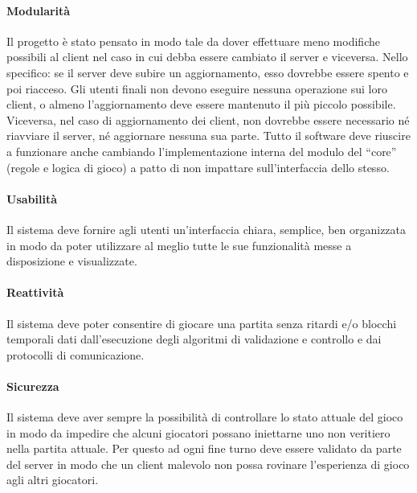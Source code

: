 \paragraph{Modularità}
Il progetto è stato pensato in modo tale da dover effettuare meno modifiche possibili al client nel caso in cui debba essere cambiato il server e viceversa.
Nello specifico: se il server deve subire un aggiornamento, esso dovrebbe essere spento e poi riacceso.
Gli utenti finali non devono eseguire nessuna operazione sui loro client, o almeno l’aggiornamento deve essere mantenuto il più piccolo possibile.
Viceversa, nel caso di aggiornamento dei client, non dovrebbe essere necessario né riavviare il server, né aggiornare nessuna sua parte.
Tutto il software deve riuscire a funzionare anche cambiando l’implementazione interna del modulo del “core” (regole e logica di gioco) a patto di non impattare sull’interfaccia dello stesso.

\paragraph{Usabilità}
Il sistema deve fornire agli utenti un'interfaccia chiara, semplice, ben organizzata in modo da poter utilizzare al meglio tutte le sue funzionalità messe a disposizione e visualizzate.

\paragraph{Reattività}
Il sistema deve poter consentire di giocare una partita senza ritardi e/o blocchi temporali dati dall’esecuzione degli algoritmi di validazione e controllo e dai protocolli di comunicazione.

\paragraph{Sicurezza}
Il sistema deve aver sempre la possibilità di controllare lo stato attuale del gioco in modo da impedire che alcuni giocatori possano iniettarne uno non veritiero nella partita attuale.
Per questo ad ogni fine turno deve essere validato da parte del server in modo che un client malevolo non possa rovinare l’esperienza di gioco agli altri giocatori.

